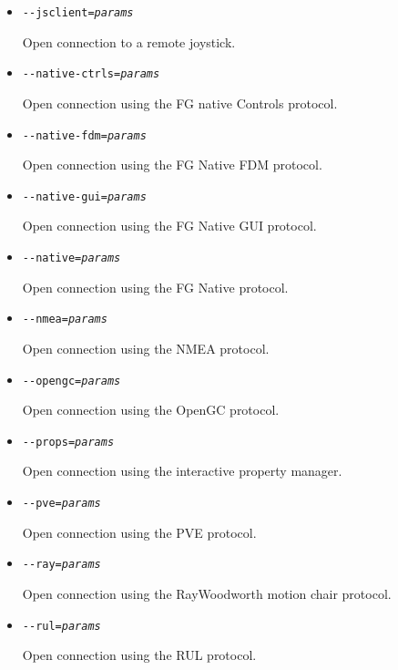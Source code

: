 \begin{itemize}
{\begin{itemize}
    Open connection to an Agwagon joystick.

  \item{\texttt{-$ $-jsclient={\it params}}}

    Open connection to a remote joystick.

  \item{\texttt{-$ $-native-ctrls={\it params}}}

    Open connection using the FG native Controls protocol.

  \item{\texttt{-$ $-native-fdm={\it params}}}

    Open connection using the FG Native FDM protocol.

  \item{\texttt{-$ $-native-gui={\it params}}}

    Open connection using the FG Native GUI protocol.

  \item{\texttt{-$ $-native={\it params}}}

    Open connection using the FG Native protocol.

  \item{\texttt{-$ $-nmea={\it params}}}

    Open connection using the NMEA protocol.

  \item{\texttt{-$ $-opengc={\it params}}}

    Open connection using the OpenGC protocol.

  \item{\texttt{-$ $-props={\it params}}}

    Open connection using the interactive property manager.

  \item{\texttt{-$ $-pve={\it params}}}

    Open connection using the PVE protocol.

  \item{\texttt{-$ $-ray={\it params}}}

    Open connection using the RayWoodworth motion chair protocol.

  \item{\texttt{-$ $-rul={\it params}}}

    Open connection using the RUL protocol.

  \end{itemize}
}
\fi

\end{itemize}

